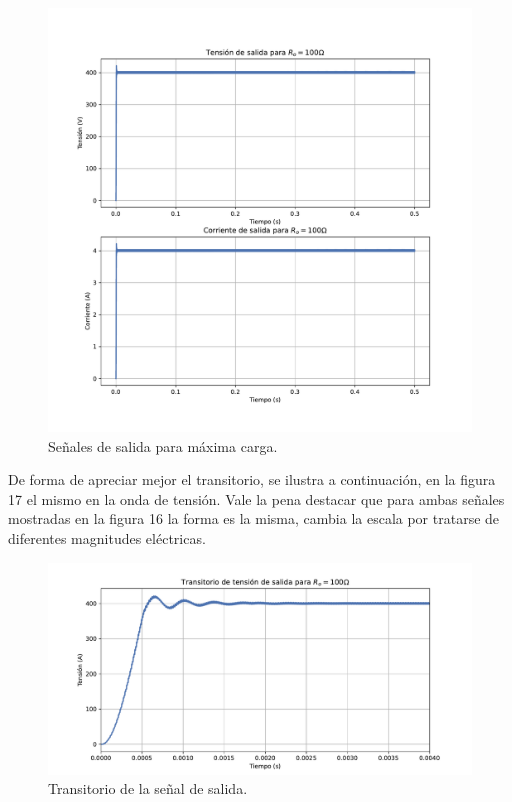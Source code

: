 \begin{figure}
	\centering
	\includegraphics[width=1\linewidth]{img/salida_40}
	\caption{Señales de salida para máxima carga.}
	\label{fig:salida40}
\end{figure}

De forma de apreciar mejor el transitorio, se ilustra a continuación, en la figura 17 el mismo en la onda de tensión. Vale la pena destacar que para ambas señales mostradas en la figura 16 la forma es la misma, cambia la escala por tratarse de diferentes magnitudes eléctricas.

\begin{figure}
	\centering
	\includegraphics[width=1\linewidth]{img/transitorio}
	\caption{Transitorio de la señal de salida.}
	\label{fig:transitorio}
\end{figure}

